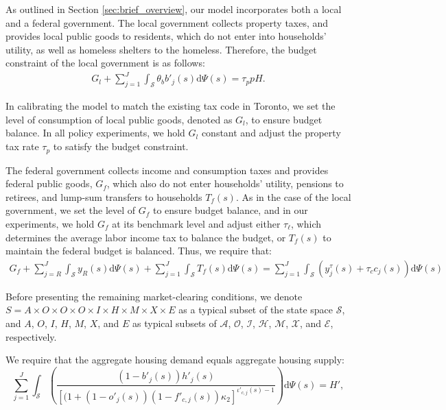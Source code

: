 \documentclass[parskip=full]{article}
\begin{document}
As outlined in Section \ref{sec:brief_overview}, our model incorporates both a local and a federal government. The local government collects property taxes, and provides local public goods to residents, which do not enter into households' utility, as well as homeless shelters to the homeless. Therefore, the budget constraint of the local government is as follows:
\begin{align}\label{eq:gbc_1}
  G_l +\sum_{j=1}^J \int_\mathcal{S} \theta_{b} b'_{j}(s)\mathrm{d}\Psi(s) = \tau_{p} p H.
\end{align}

\noindent In calibrating the model to match the existing tax code in Toronto, we set the level of consumption of local public goods, denoted as $G_l$, to ensure budget balance. In all policy experiments, we hold $G_l$ constant and adjust the property tax rate $\tau_{p}$ to satisfy the budget constraint.

The federal government collects income and consumption taxes and provides federal public goods, $G_{f}$, which also do not enter households' utility, pensions to retirees, and lump-sum transfers to households $T_{f}(s)$. As in the case of the local government, we set the level of $G_{f}$ to ensure budget balance, and in our experiments, we hold $G_{f}$ at its benchmark level and adjust either $\tau_\ell$, which determines the average labor income tax to balance the budget, or $T_{f}(s)$ to maintain the federal budget is balanced. Thus, we require that:
\begin{align}\label{eq:gbc_2}
   G_{f}+\sum_{j=R}^J \int_\mathcal{S} y_{R}(s)\mathrm{d}\Psi(s)+\sum_{j=1}^J \int_\mathcal{S} T_f(s) \mathrm{d}\Psi(s)=\sum_{j=1}^J \int_\mathcal{S} \left(y^{\tau}_{j}(s)+\tau_{c}c_{j}(s)\right)\mathrm{d}\Psi(s) 
\end{align}

Before presenting the remaining market-clearing conditions, we denote $S=A\times O \times O \times O \times I \times H\times M\times X \times E$ as a typical subset of the state space $\mathcal{S}$, and $A$, $O$, $I$, $H$, $M$, $X$, and $E$ as typical subsets of $\mathcal{A}$, $\mathcal{O}$, $\mathcal{I}$, $\mathcal{H}$, $\mathcal{M}$, $\mathcal{X}$, and $\mathcal{E}$, respectively.

We require that the aggregate housing demand equals aggregate housing supply:
\begin{equation}
\label{eq:housing_clearing_condition}
  \sum_{j=1}^J \int_\mathcal{S}  \left(\frac{(1-b'_{j}(s))h'_{j}(s)}{\left[(1+(1-o'_{j}(s))(1-f'_{c,j}(s))\kappa_{2}\right]^{\iota'_{c,j}(s)-1}}\right) \mathrm{d}\Psi(s) = H',
\end{equation}
\end{document}
